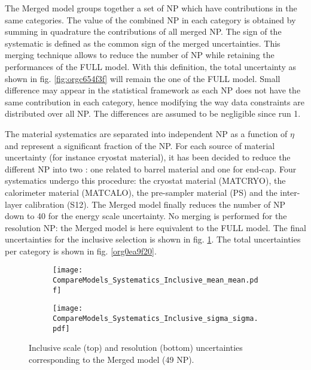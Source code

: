 \begin{enumerate}
\begin{enumerate}
The Merged model groups together a set of NP which have contributions in the same categories.
The value of the combined NP in each category  is obtained by summing in quadrature the contributions of all merged NP.
The sign of the systematic is defined as the common sign of the merged uncertainties.
This merging technique allows to reduce the number of NP while retaining the performances of the FULL model.
With this definition, the total uncertainty as shown in fig. \ref{fig:orgc654f3f} will remain the one of the FULL model.
Small difference may appear in the statistical framework as each NP does not have the same contribution in each category, hence modifying the way data constraints are distributed over all NP.
The differences are assumed to be negligible since run 1.

The material systematics are separated into independent NP as a function of $\eta$ and represent a significant fraction of the NP.
For each source of material uncertainty (for instance cryostat material), it has been decided to reduce the different NP into two : one related to barrel material and one for end-cap.
Four systematics undergo this procedure: the cryostat material (MATCRYO), the calorimeter material (MATCALO), the pre-sampler material (PS) and the inter-layer calibration (S12).
The Merged model finally reduces the number of NP down to 40 for the energy scale uncertainty.
No merging is performed for the resolution NP: the Merged model is here equivalent to the FULL model.
The final uncertainties for the inclusive selection is shown in fig. \ref{org42d9a0c}.
The total uncertainties per category is shown in fig. \ref{org0ea9f20}.


\begin{figure}
\begin{subfigure}[t]{\linewidth}
\begin{center}
\texttt{[image: CompareModels\_Systematics\_Inclusive\_mean\_mean.pdf]}
\end{center}
\end{subfigure}
\begin{subfigure}[t]{\linewidth}
\begin{center}
\texttt{[image: CompareModels\_Systematics\_Inclusive\_sigma\_sigma.pdf]}
\end{center}
\end{subfigure}
\caption{\label{org42d9a0c}
Inclusive scale (top) and resolution (bottom) uncertainties corresponding to the Merged model (49 NP).}
\end{figure}



\end{enumerate}
\end{enumerate}
